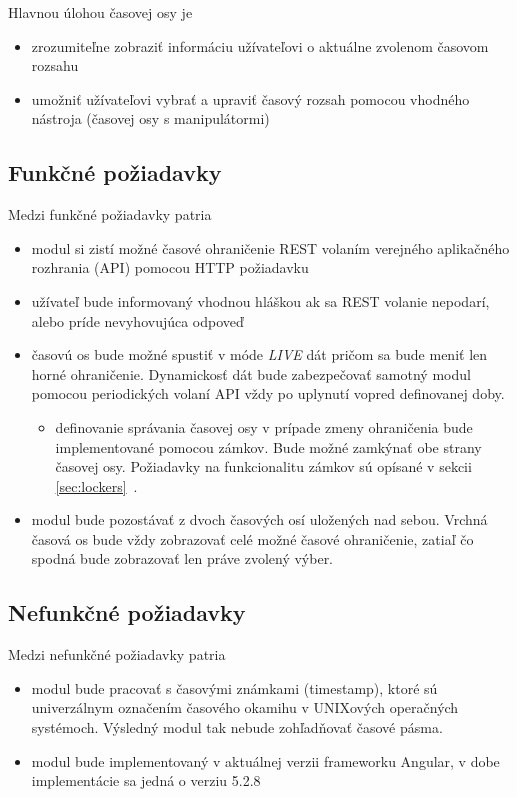 \documentclass[
  digital, %
  twoside, %
  notable,   %
  nolof,   %
  nolot,   %
]{fithesis3}
\begin{document}
Hlavnou úlohou časovej osy je
\begin{itemize}
\item zrozumiteľne zobraziť informáciu užívateľovi o aktuálne zvolenom časovom rozsahu
\item umožniť užívateľovi vybrať a upraviť časový rozsah pomocou vhodného nástroja (časovej osy s manipulátormi)
\end{itemize}

\subsection{Funkčné požiadavky}
Medzi funkčné požiadavky patria
\begin{itemize}
\item modul si zistí možné časové ohraničenie REST volaním verejného aplikačného rozhrania (API) pomocou HTTP požiadavku
\item užívateľ bude informovaný vhodnou hláškou ak sa REST volanie nepodarí, alebo príde nevyhovujúca odpoveď
\item časovú os bude možné spustiť v móde \textit{LIVE} dát pričom sa bude meniť len horné ohraničenie. Dynamickosť dát bude zabezpečovať samotný modul pomocou periodických volaní API vždy po uplynutí vopred definovanej doby.
\begin{itemize}
\item definovanie správania časovej osy v prípade zmeny ohraničenia bude implementované pomocou zámkov. Bude možné zamkýnať obe strany časovej osy. Požiadavky na funkcionalitu zámkov sú opísané v sekcii \ref{sec:lockers}~.
\end{itemize}
\item modul bude pozostávať z dvoch časových osí uložených nad sebou. Vrchná časová os bude vždy zobrazovať celé možné časové ohraničenie, zatiaľ čo spodná bude zobrazovať len práve zvolený výber.
\end{itemize}

\subsection{Nefunkčné požiadavky}
Medzi nefunkčné požiadavky patria
\begin{itemize}
\item modul bude pracovať s časovými známkami (timestamp), ktoré sú univerzálnym označením časového okamihu v UNIXových operačných systémoch. Výsledný modul tak nebude zohľadňovať časové pásma.
\item modul bude implementovaný v aktuálnej verzii frameworku Angular, v dobe implementácie sa jedná o verziu 5.2.8
\end{itemize}
\end{document}
